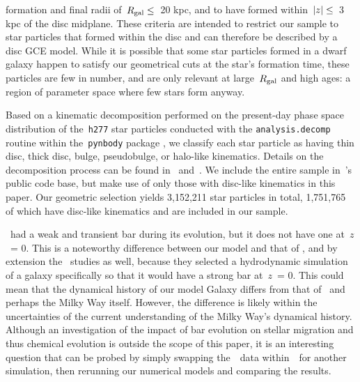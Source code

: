 \documentclass[draft2.tex]{subfiles}
\begin{document}
formation and final radii of~$R_\text{gal} \leq$~20 kpc, and to have formed 
within~$\left|z\right|\leq$~3 kpc of the disc midplane. 
These criteria are intended to restrict our sample to star particles that 
formed within the disc and can therefore be described by a disc GCE model. 
While it is possible that some star particles formed in a dwarf galaxy happen 
to satisfy our geometrical cuts at the star's formation time, these particles 
are few in number, and are only relevant at large~$R_\text{gal}$ and high 
ages: a region of parameter space where few stars form anyway. 
\par 
Based on a kinematic decomposition performed on the present-day phase space 
distribution of the~\texttt{h277} star particles conducted with the 
\texttt{analysis.decomp} routine within the~\texttt{pynbody} package 
\citep{pynbody}, we classify each star particle as having thin disc, thick 
disc, bulge, pseudobulge, or halo-like kinematics.
Details on the decomposition process can be found in~\citet{Brook2012} 
and~\citet{Bird2013}. 
We include the entire sample in~\vice's public code base, but make use of only 
those with disc-like kinematics in this paper. 
Our geometric selection yields 3,152,211 star particles in total, 1,751,765 of 
which have disc-like kinematics and are included in our sample. 
\par 
\hsim~had a weak and transient bar during its evolution, but it does not have 
one at~$z$~= 0. 
This is a noteworthy difference between our model and that of 
\citet{Minchev2013}, and by extension the~\citet{Minchev2014, Minchev2017} 
studies as well, because they selected a hydrodynamic simulation of a galaxy 
specifically so that it would have a strong bar at~$z$~= 0. 
This could mean that the dynamical history of our model Galaxy differs from 
that of~\citet{Minchev2013} and perhaps the Milky Way itself. 
However, the difference is likely within the uncertainties of the current 
understanding of the Milky Way's dynamical history. 
Although an investigation of the impact of bar evolution on stellar migration 
and thus chemical evolution is outside the scope of this paper, it is an 
interesting question that can be probed by simply swapping the~\hsim~data 
within~\vice~for another simulation, then rerunning our numerical models and 
comparing the results. 
\end{document}
